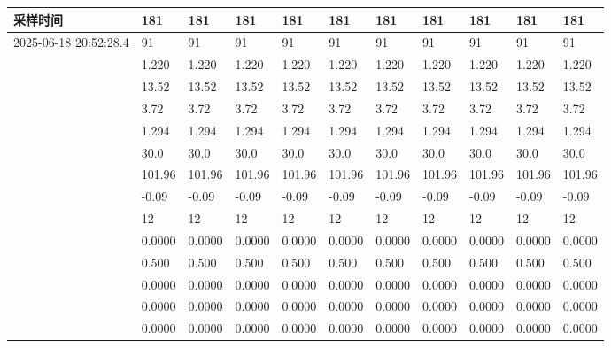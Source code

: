 \documentclass[UTF8,10pt,a4paper,fontset=fandol]{ctexart}
\begin{document}

\newpage


\begin{sideways}
\scriptsize
\setlength{\tabcolsep}{2pt}
\begin{tabular}{|p{2.55cm}|*{10}{p{0.58cm}|}}
\hline
\textbf{采样时间} &
\textbf{181} & \textbf{181} & \textbf{181} & \textbf{181} &
\textbf{181} & \textbf{181} & \textbf{181} & \textbf{181} &
\textbf{181} & \textbf{181} \\
\hline
2025-06-18 20:52:28.4 &
91 & 91 & 91 & 91 & 91 & 91 & 91 & 91 & 91 & 91 \\
\hline
&
1.220 & 1.220 & 1.220 & 1.220 & 1.220 &
1.220 & 1.220 & 1.220 & 1.220 & 1.220 \\
\hline
&
13.52 & 13.52 & 13.52 & 13.52 & 13.52 &
13.52 & 13.52 & 13.52 & 13.52 & 13.52 \\
\hline
&
3.72 & 3.72 & 3.72 & 3.72 & 3.72 &
3.72 & 3.72 & 3.72 & 3.72 & 3.72 \\
\hline
&
1.294 & 1.294 & 1.294 & 1.294 & 1.294 &
1.294 & 1.294 & 1.294 & 1.294 & 1.294 \\
\hline
&
30.0 & 30.0 & 30.0 & 30.0 & 30.0 &
30.0 & 30.0 & 30.0 & 30.0 & 30.0 \\
\hline
&
101.96 & 101.96 & 101.96 & 101.96 & 101.96 &
101.96 & 101.96 & 101.96 & 101.96 & 101.96 \\
\hline
&
-0.09 & -0.09 & -0.09 & -0.09 & -0.09 &
-0.09 & -0.09 & -0.09 & -0.09 & -0.09 \\
\hline
&
12 & 12 & 12 & 12 & 12 & 12 & 12 & 12 & 12 & 12 \\
\hline
&
0.0000 & 0.0000 & 0.0000 & 0.0000 & 0.0000 &
0.0000 & 0.0000 & 0.0000 & 0.0000 & 0.0000 \\
\hline
&
0.500 & 0.500 & 0.500 & 0.500 & 0.500 &
0.500 & 0.500 & 0.500 & 0.500 & 0.500 \\
\hline
&
0.0000 & 0.0000 & 0.0000 & 0.0000 & 0.0000 &
0.0000 & 0.0000 & 0.0000 & 0.0000 & 0.0000 \\
\hline
&
0.0000 & 0.0000 & 0.0000 & 0.0000 & 0.0000 &
0.0000 & 0.0000 & 0.0000 & 0.0000 & 0.0000 \\
\hline
&
0.0000 & 0.0000 & 0.0000 & 0.0000 & 0.0000 &
0.0000 & 0.0000 & 0.0000 & 0.0000 & 0.0000 \\

\end{tabular}
\end{sideways}
\end{document}
